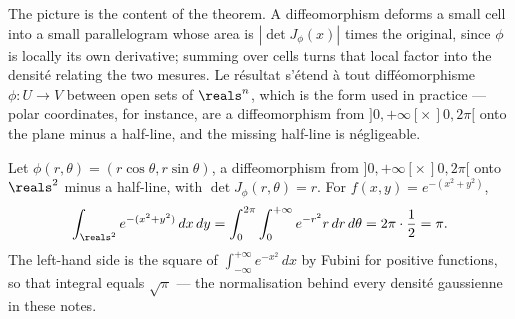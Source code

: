 \begin{figure}[h!]
  \centering
  \vspace{0.9cm}
\end{figure}

\medskip
The picture is the content of the theorem. A diffeomorphism deforms a small cell into
a small parallelogram whose area is $|\det J_{\phi}(x)|$ times the original, since
$\phi$ is locally its own derivative; summing over cells turns that local factor
into the densité relating the two mesures. Le résultat s'étend à tout
difféomorphisme $\phi : U \to V$ between open sets of $\reals^{n}$, which is the
form used in practice --- polar coordinates, for instance, are a diffeomorphism from
$]0,+\infty[ \times \, ]0,2\pi[$ onto the plane minus a half-line, and the missing
half-line is négligeable.

\begin{example}
  Let $\phi(r,\theta) = (r\cos\theta, r\sin\theta)$, a diffeomorphism from
  $]0,+\infty[ \times \, ]0,2\pi[$ onto $\reals^{2}$ minus a half-line, with
  $\det J_{\phi}(r,\theta) = r$. For $f(x,y) = e^{-(x^{2}+y^{2})}$,
  \[
    \int_{\reals^{2}} e^{-(x^{2}+y^{2})} \, dx \, dy
    = \int_{0}^{2\pi} \int_{0}^{+\infty} e^{-r^{2}} r \, dr \, d\theta
    = 2\pi \cdot \frac{1}{2} = \pi .
  \]
  The left-hand side is the square of $\int_{-\infty}^{+\infty} e^{-x^{2}} \, dx$ by
  Fubini for positive functions, so that integral equals $\sqrt{\pi}$ --- the
  normalisation behind every densité gaussienne in these notes.
\end{example}

